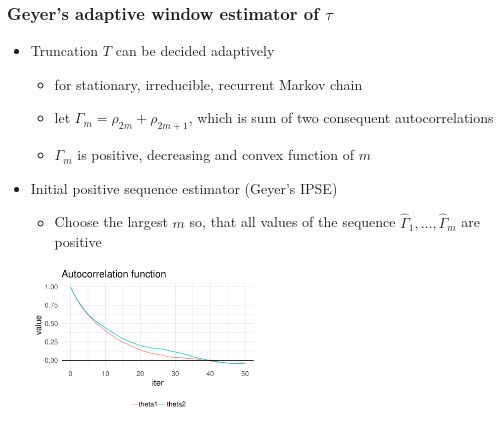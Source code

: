 \documentclass[10pt]{beamer}
\begin{document}
\begin{frame}

\frametitle{Geyer's adaptive window estimator of $\tau$}

  \begin{itemize}
  \item Truncation $T$ can be decided adaptively
    \begin{itemize}
    \item for stationary, irreducible, recurrent Markov chain
    \item let $\Gamma_m=\rho_{2m}+\rho_{2m+1}$, which is sum of two
      consequent autocorrelations
    \item $\Gamma_m$ is positive, decreasing and convex function of $m$
    \end{itemize}
    \vspace{0.5\baselineskip}
  \item<2-> Initial positive sequence estimator (Geyer's IPSE)
      \begin{itemize}
        \item Choose the largest $m$ so, that all values of the sequence
        $\hat{\Gamma}_1, \ldots, \hat{\Gamma}_m$ are positive
      \end{itemize}
  \vspace{0.5\baselineskip}
      \includegraphics[width=6cm]{figs/Metrop1acf.pdf}
  \end{itemize}
\end{frame}

\end{document}
